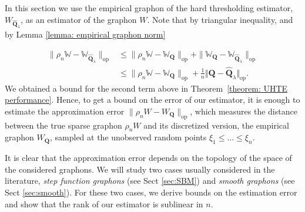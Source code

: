 \documentclass[11pt]{article}
\newcommand{\op}{\mathrm{op}}
\newcommand{\bQ}{\bm{Q}}
\newcommand{\bQhat}{\widehat{\bm{Q}}}
\newcommand{\opnorm}[1]{\|#1\|_{\mathrm{op}}}
\newcommand{\bbW}{\mathbb{W}}
\newcommand{\<}{\langle}
\renewcommand{\>}{\rangle}
\theoremstyle{plain}
\theoremstyle{definition}
\theoremstyle{remark}
\begin{document}
In this section we use the empirical graphon of the  hard thresholding estimator, $W_{\bQhat_\lambda}$, as an estimator of the graphon $W$. Note that by triangular inequality, and by Lemma \ref{lemma: empirical graphon norm}

\begin{align*}
    \opnorm{\rho_n \bbW - \bbW_{\bQhat_\lambda}} &\le \opnorm{\rho_n \bbW - \bbW_{\bQ}} +  \opnorm{\bbW_{\bQ}- \bbW_{\bQhat_\lambda}} \\
    &\le \opnorm{\rho_n \bbW - \bbW_{\bQ}} + \frac{1}{n} \Vert \bQ - \bQhat_\lambda \Vert_{\op}. 
\end{align*}
We obtained a bound for the second term above in Theorem~\ref{theorem: UHTE performance}.
Hence, to get a bound on the error of our estimator, it is enough to estimate the approximation error $\opnorm{\rho_n W - W_{\bQ}}$, which measures the distance between the true  sparse graphon $\rho_n W$  and its discretized version, the empirical graphon $W_{\bQ}$,
sampled at the unobserved random  points $\xi_1\le \dots\le \xi_n$.

 It is clear that the approximation error depends on the topology of the space of the considered graphons. We will study  two cases usually considered in the literature,
\textit{step function graphons} (see Sect \ref{sec:SBM}) and \textit{smooth graphons} (see Sect \ref{sec:smooth}). For these two cases, we  derive bounds on the estimation error and show that the rank of our estimator is sublinear in $n$. 
\end{document}
